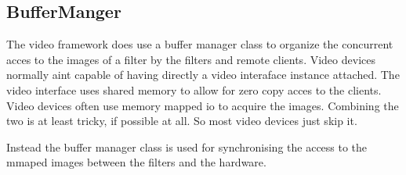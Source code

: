 \subsection{BufferManger}

The video framework does use a buffer manager class to organize the
concurrent acces to the images of a filter by the filters and remote
clients. Video devices normally aint capable of having directly a
video interaface instance attached. The video interface uses shared
memory to allow for zero copy acces to the clients. Video devices
often use memory mapped io to acquire the images. Combining the two is
at least tricky, if possible at all. So most video devices just skip
it.

Instead the buffer manager class is used for synchronising the access
to the mmaped images between the filters and the hardware.



